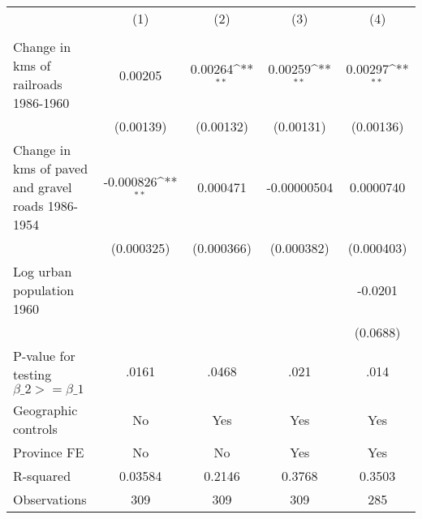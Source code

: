 {
\def\sym#1{\ifmmode^{#1}\else\(^{#1}\)\fi}
\begin{tabular}{l*{4}{c}}
\hline\hline
                &\multicolumn{1}{c}{(1)}&\multicolumn{1}{c}{(2)}&\multicolumn{1}{c}{(3)}&\multicolumn{1}{c}{(4)}\\
                &\multicolumn{1}{c}{}&\multicolumn{1}{c}{}&\multicolumn{1}{c}{}&\multicolumn{1}{c}{}\\
\hline
Change in kms of railroads 1986-1960&  0.00205         &  0.00264\sym{**} &  0.00259\sym{**} &  0.00297\sym{**} \\
                &(0.00139)         &(0.00132)         &(0.00131)         &(0.00136)         \\
[1em]
Change in kms of paved and gravel roads 1986-1954&-0.000826\sym{**} & 0.000471         &-0.00000504         &0.0000740         \\
                &(0.000325)         &(0.000366)         &(0.000382)         &(0.000403)         \\
[1em]
Log urban population 1960&                  &                  &                  &  -0.0201         \\
                &                  &                  &                  & (0.0688)         \\
\hline
P-value for testing $\beta\_{2} >= \beta\_{1}$&    .0161         &    .0468         &     .021         &     .014         \\
Geographic controls&       No         &      Yes         &      Yes         &      Yes         \\
Province FE     &       No         &       No         &      Yes         &      Yes         \\
R-squared       &  0.03584         &   0.2146         &   0.3768         &   0.3503         \\
Observations    &      309         &      309         &      309         &      285         \\
\hline\hline
\end{tabular}
}
